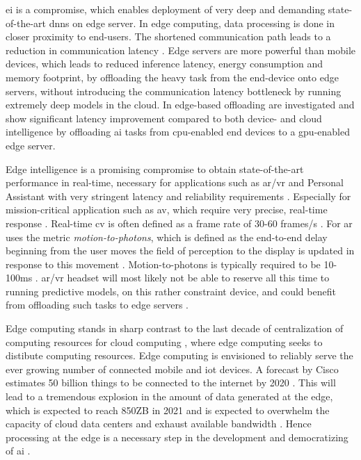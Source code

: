 \gls{ei} is a compromise, which enables deployment of very deep and demanding state-of-the-art \gls{dnn}s on edge server. In edge computing, data processing is done in closer proximity to end-users. The shortened communication path leads to a reduction in communication latency \cite{shi_edge_2016}. Edge servers are more powerful than mobile devices, which leads to reduced inference latency, energy consumption and memory footprint, by offloading the heavy task from the end-device onto edge servers, without introducing the communication latency bottleneck by running extremely deep models in the cloud\cite{zhou_edge_2019}. In \cite{karlsen_prototyping_nodate} edge-based offloading are investigated and show significant latency improvement compared to both device- and cloud intelligence by offloading \gls{ai} tasks from \gls{cpu}-enabled end devices to a \gls{gpu}-enabled edge server.  

Edge intelligence is a promising compromise to obtain state-of-the-art performance in real-time, necessary for applications such as \gls{ar}/\gls{vr} and Personal Assistant with very stringent latency and reliability requirements \cite{zhou_edge_2019}. Especially for mission-critical application such as \gls{av}, which require very precise, real-time response \cite{stoica_berkeley_2017}. Real-time \gls{cv} is often defined as a frame rate of 30-60 frames/s \cite{chen_deep_2019}. For \gls{ar} uses the metric \emph{motion-to-photons}, which is defined as the end-to-end delay beginning from the user moves the field of perception to the display is updated in response to this movement \cite{lavalle_virtual_2019}. Motion-to-photons is typically required to be 10-100ms \cite{chen_deep_2019}. \gls{ar}/\gls{vr} headset will most likely not be able to reserve all this time to running predictive models, on this rather constraint device, and could benefit from offloading such tasks to edge servers \cite{chen_deep_2019}.

Edge computing stands in sharp contrast to the last decade of centralization of computing resources for cloud computing \cite{shi_edge_2016}, where edge computing seeks to distibute computing resources. Edge computing is envisioned to reliably serve the ever growing number of connected mobile and \gls{iot} devices. A forecast by Cisco estimates 50 billion things to be connected to the internet by 2020 \cite{evans_internet_2011}. This will lead to a tremendous explosion in the amount of data generated at the edge, which is expected to reach 850ZB in 2021 \cite{cisco_cisco_2018} and is expected to overwhelm the capacity of cloud data centers and exhaust available bandwidth . Hence processing at the edge is a necessary step in the development and democratizing of \gls{ai} \cite{zhou_edge_2019}.


